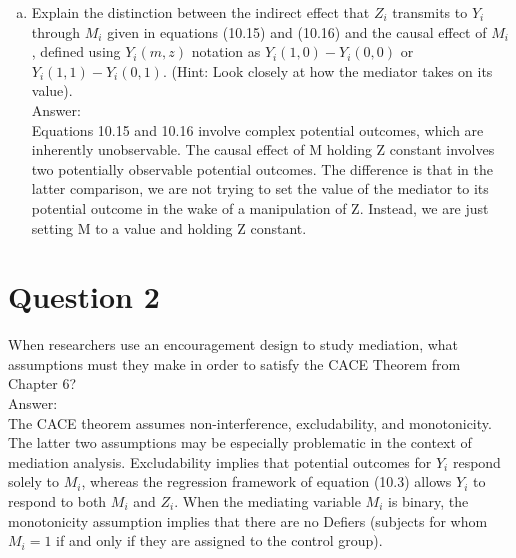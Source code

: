 \documentclass[11pt,notitlepage]{article}\usepackage[]{graphicx}\usepackage[]{color}
\begin{document}
\begin{enumerate}[a)]
\item Explain the distinction between the indirect effect that $Z_i$ transmits to $Y_i$ through $M_i$ given in equations (10.15) and (10.16) and the causal effect of $M_i$, defined using $Y_i(m, z)$ notation as $Y_i(1, 0) - Y_i(0, 0)$ or $Y_i(1, 1) - Y_i(0, 1)$. (Hint: Look closely at how the mediator takes on its value).\\
Answer:\\
Equations 10.15 and 10.16 involve complex potential outcomes, which are inherently unobservable. The causal effect of M holding Z constant involves two potentially observable potential outcomes. The difference is that in the latter comparison, we are not trying to set the value of the mediator to its potential outcome in the wake of a manipulation of Z. Instead, we are just setting M to a value and holding Z constant.
\end{enumerate}


\section*{Question 2}
When researchers use an encouragement design to study mediation, what assumptions must they make in order to satisfy the CACE Theorem from Chapter 6? \\
Answer:\\
The CACE theorem assumes non-interference, excludability, and monotonicity. The latter two assumptions may be especially problematic in the context of mediation analysis. Excludability implies that potential outcomes for $Y_i$ respond solely to $M_i$, whereas the regression framework of equation (10.3) allows $Y_i$ to respond to both $M_i$ and $Z_i$. When the mediating variable $M_i$ is binary, the monotonicity assumption implies that there are no Defiers (subjects for whom $M_i=1$ if and only if they are assigned to the control group).
\end{document}
